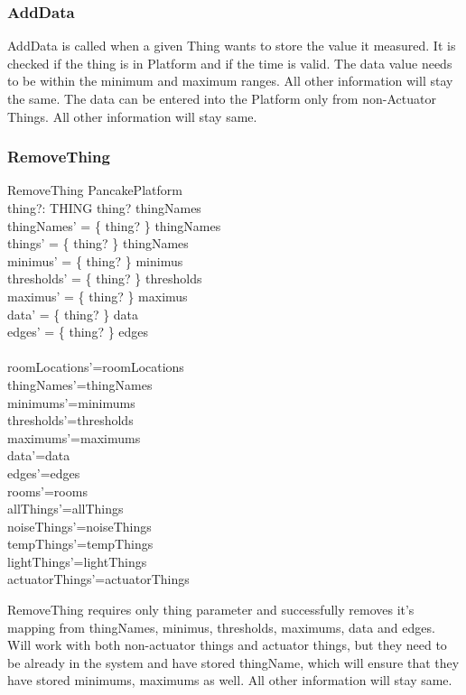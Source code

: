 \documentclass{article}
\newcommand{\same}[1]{\\{#1}'={#1}}
\newcommand{\sameObvious}[1]{\same{rooms}\same{allThings}\same{noiseThings}\same{tempThings}\same{lightThings}\same{actuatorThings}  }
\begin{document}
\subsubsection{AddData}
AddData is called when a given Thing wants to store the value it measured. It is checked if the thing is in Platform and if the time is valid. The data value needs to be within the minimum and maximum ranges. All other information will stay the same. The data can be entered into the Platform only from non-Actuator Things. All other information will stay same.

\newpage
\label{toc:RemoveThing}
\subsubsection{RemoveThing}
\begin{schema}{RemoveThing}
  \Delta PancakePlatform \\
  thing?: THING
\where
  thing? \in \dom thingNames \\
  
  thingNames' = \{  thing? \}  \ndres thingNames \\
  things' = \{  thing? \}  \ndres thingNames \\  
  minimus' = \{  thing? \}  \ndres minimus \\
  thresholds' = \{  thing? \}  \ndres thresholds \\
  maximus' = \{  thing? \}  \ndres maximus \\
  data' = \{  thing? \}  \ndres data \\
  edges' = \{  thing? \}  \ndres edges \\
  
  \same{roomLocations}
  \same{thingNames}
  \same{minimums}
  \same{thresholds}
  \same{maximums}
  \same{data}
  \same{edges}
  \sameObvious{}  
\end{schema}
RemoveThing requires only thing parameter and successfully removes it's mapping from thingNames, minimus, thresholds, maximums, data and edges. Will work with both non-actuator things and actuator things, but they need to be already in the system and have stored thingName, which will ensure that they have stored minimums, maximums as well. All other information will stay same.
\end{document}
